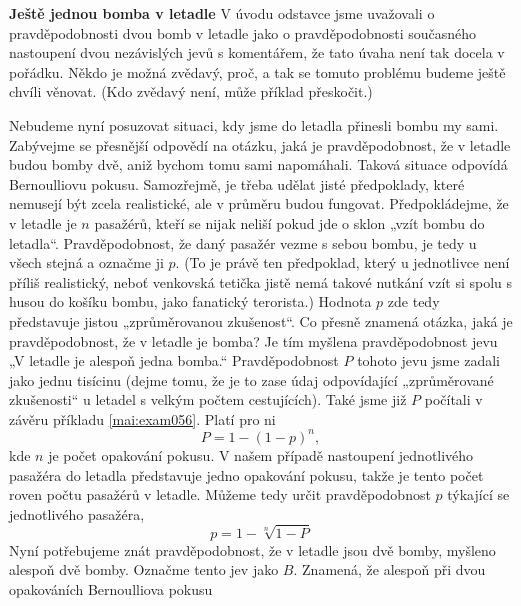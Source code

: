 \wikitextrule
\begin{example}\label{mai:exam060}
  \textbf{Ještě jednou bomba v letadle}\newline\small
  V úvodu odstavce jsme uvažovali o pravděpodobnosti dvou bomb v letadle jako o pravděpodobnosti 
  současného nastoupení dvou nezávislých jevů s komentářem, že tato úvaha není tak docela v 
  pořádku. Někdo je možná zvědavý, proč, a tak se tomuto problému budeme ještě chvíli věnovat. (Kdo 
  zvědavý není, může příklad přeskočit.)
  
  Nebudeme nyní posuzovat situaci, kdy jsme do letadla přinesli bombu my sami. Zabývejme se 
  přesnější odpovědí na otázku, jaká je pravděpodobnost, že v letadle budou bomby dvě, aniž bychom 
  tomu sami napomáhali. Taková situace odpovídá Bernoulliovu pokusu. Samozřejmě, je třeba udělat 
  jisté předpoklady, které nemusejí být zcela realistické, ale v průměru budou fungovat. 
  Předpokládejme, že v letadle je \(n\) pasažérů, kteří se nijak neliší pokud jde o sklon „vzít 
  bombu do letadla“. Pravděpodobnost, že daný pasažér vezme s sebou bombu, je tedy u všech stejná a 
  označme ji \(p\). (To je právě ten předpoklad, který u jednotlivce není příliš realistický, neboť 
  venkovská tetička jistě nemá takové nutkání vzít si spolu s husou do košíku bombu, jako 
  fanatický terorista.) Hodnota \(p\) zde tedy představuje jistou „zprůměrovanou zkušenost“. Co 
  přesně znamená otázka, jaká je pravděpodobnost, že v letadle je bomba? Je tím myšlena 
  pravděpodobnost jevu „V letadle je alespoň jedna bomba.“ Pravděpodobnost \(P\) tohoto jevu jsme 
  zadali jako jednu tisícinu (dejme tomu, že je to zase údaj odpovídající „zprůměrované zkušenosti“ 
  u letadel s velkým počtem cestujících). Také jsme již \(P\) počítali v závěru příkladu 
  \ref{mai:exam056}. Platí pro ni
  \begin{equation*}
    P = 1 - (1 - p)^n,
  \end{equation*}
  kde \(n\) je počet opakování pokusu. V našem případě nastoupení jednotlivého pasažéra do letadla 
  představuje jedno opakování pokusu, takže je tento počet roven počtu pasažérů v letadle. Můžeme 
  tedy určit pravděpodobnost \(p\) týkající se jednotlivého pasažéra,
  \begin{equation*}
    p = 1 - \sqrt[n]{1 - P}
  \end{equation*}
  Nyní potřebujeme znát pravděpodobnost, že v letadle jsou dvě bomby, myšleno alespoň dvě bomby. 
  Označme tento jev jako \(B\). Znamená, že alespoň při dvou opakováních Bernoulliova pokusu 

\end{example}
